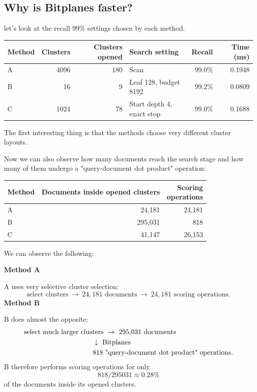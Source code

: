 \subsection{Why is Bitplanes faster?}

let's look at the recall 99\% settings chosen by each method.
\begin{center}\small
\begin{tabularx}{\linewidth}{@{}lrrYrr@{}}\toprule
Method & Clusters & Clusters opened & Search setting & Recall & Time (ms)\\\midrule
A & 4096 & 180 & Scan & 99.0\% & 0.1948\\
B & 16 & 9 & Leaf 128, budget 8192 & 99.2\% & 0.0809\\
C & 1024 & 78 & Start depth 4, exact stop & 99.0\% & 0.1688\\\bottomrule
\end{tabularx}
\end{center}

The first interesting thing is that the methods choose very different cluster layouts.

Now we can also observe how many documents reach the search stage and how many of them undergo a "query-document dot product" operation:
\begin{center}\small
\begin{tabular}{@{}lrr@{}}\toprule
Method & Documents inside opened clusters & \shortstack{Scoring\\operations}\\\midrule
A & 24,181 & 24,181\\
B & 295,031 & 818\\
C & 41,147 & 26,153\\\bottomrule
\end{tabular}
\end{center}
We can observe the following:

\textbf{Method A}\par
A uses very selective cluster selection:
\[
\text{select clusters}\ \to\ 24{,}181\text{ documents}\ \to\ 24{,}181\text{ scoring operations}.
\]
\textbf{Method B}\par
B does almost the opposite:
\[
\begin{aligned}
&\text{select much larger clusters}\ \to\ 295{,}031\text{ documents}\\
&\hspace{35mm}\downarrow\ \text{Bitplanes}\\
&\hspace{35mm}818\text{ "query-document dot product" operations}.
\end{aligned}
\]
B therefore performs scoring operations for only
\[
818/295031\approx0.28\%
\]
of the documents inside its opened clusters.

